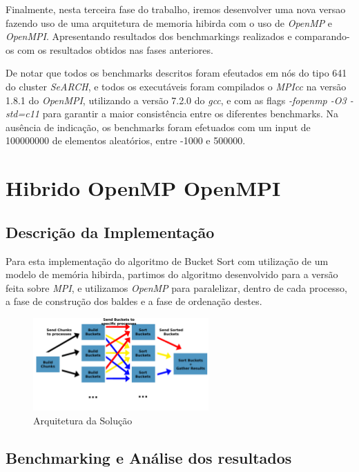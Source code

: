 \documentclass[a4paper]{report}
\begin{document}
Finalmente, nesta terceira fase do trabalho, iremos desenvolver uma nova versao
fazendo uso de uma arquitetura de memoria hibirda com o uso de \textit{OpenMP}
e \textit{OpenMPI}. Apresentando resultados dos benchmarkings realizados e
comparando-os com os resultados obtidos nas fases anteriores.

De notar que todos os benchmarks descritos foram efeutados em nós do tipo 641 do
cluster \textit{SeARCH}, e todos os executáveis foram compilados o
\textit{MPIcc} na versão 1.8.1 do \textit{OpenMPI}, utilizando a versão
7.2.0 do \textit{gcc}, e com as flags \textit{-fopenmp -O3 -std=c11} para garantir
a maior consistência entre os diferentes benchmarks. Na
ausência de indicação, os benchmarks foram efetuados com um input de 100000000
de elementos aleatórios, entre -1000 e 500000.

\chapter{Hibrido OpenMP OpenMPI} \label{chap:ompi}

\section{Descrição da Implementação}
Para esta implementação do algoritmo de Bucket Sort com utilização de um modelo
de memória hibirda, partimos do algoritmo desenvolvido para a versão feita sobre
\textit{MPI}, e utilizamos \textit{OpenMP} para paralelizar, dentro de cada
processo, a fase de construção dos baldes e a fase de ordenação destes.

\begin{figure}[h]
    \centering
    \includegraphics[width=0.6\textwidth]{images/esquemas/algoritmo_graph2.png}
    \caption{Arquitetura da Solução}
\end{figure}
\pagebreak

\section{Benchmarking e Análise dos resultados}
\end{document}
